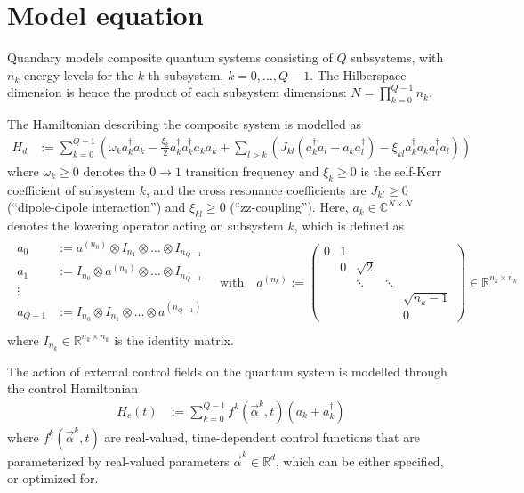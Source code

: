 \documentclass[11pt]{article}
\newcommand{\R}{\mathds{R}}
\newcommand{\C}{\mathds{C}}
\begin{document}
\section{Model equation}\label{sec:model}
Quandary models composite quantum systems consisting of $Q$ subsystems, with $n_k$ energy levels for the
$k$-th subsystem, $k=0,\dots,Q-1$. The Hilberspace dimension is hence the product of each subsystem dimensions: $N = \prod_{k=0}^{Q-1} n_k$. 

The Hamiltonian describing the composite system is modelled as 
\begin{align}
  H_d &:= \sum_{k=0}^{Q-1} \left(\omega_k a_k^{\dagger}a_k- \frac{\xi_k}{2} a_k^{\dagger}a_k^{\dagger}a_k a_k  + \sum_{l> k} \left(  J_{kl} \left( a_k^\dagger a_l + a_k a_l^\dagger \right) -\xi_{kl} a_{k}^{\dagger}a_{k}   a_{l}^{\dagger} a_{l} \right)\right)
\end{align}
where $\omega_k\geq 0$ denotes the $0 \rightarrow 1$ transition frequency and $\xi_k\geq 0$ is the self-Kerr coefficient of subsystem $k$, and the cross resonance coefficients are $J_{kl}\geq 0$ (``dipole-dipole interaction'') and $\xi_{kl}\geq 0$ (``zz-coupling''). Here,
$a_k\in \C^{N\times N}$ denotes the lowering operator acting on subsystem $k$, which is defined as
\begin{align}
  \begin{array}{rl}
  a_0 &:= a^{(n_0)} \otimes I_{n_1} \otimes \dots \otimes
  I_{n_{Q-1}}\\
  a_1 &:= I_{n_0} \otimes a^{(n_1)} \otimes \dots \otimes
  I_{n_{Q-1}}\\
  \vdots \, & \\
  a_{Q-1} &:= I_{n_0} \otimes I_{n_1} \otimes \dots \otimes
  a^{(n_{Q-1})}\\
  \end{array}
  \quad \text{with}\quad
 a^{(n_k)} := \begin{pmatrix}
   0 & 1 &          &         &    \\
     & 0 & \sqrt{2} &         &     \\
     &   & \ddots   & \ddots  &    \\
     &   &          &         & \sqrt{n_k-1}  \\
     &   &          &         & 0   
 \end{pmatrix} \in \R^{n_k \times n_k}
\end{align}
where $I_{n_k} \in \R^{n_k \times n_k}$ is the identity matrix.



The action of external control fields on the quantum system is modelled through the control Hamiltonian 
\begin{align}
  H_c(t) &:= \sum_{k=0}^{Q-1} f^k(\vec{\alpha}^k,t) \left(a_k + a_k^\dagger \right)
\end{align}
where $f^k(\vec{\alpha}^k,t)$ are real-valued, time-dependent control functions that are parameterized by real-valued parameters $\vec{\alpha}^k\in \R^d$, which can be either specified, or optimized for. 
\end{document}
